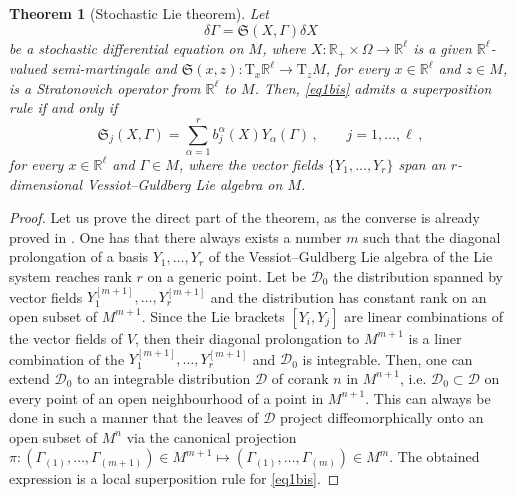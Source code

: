 \documentclass[11pt]{article}
\theoremstyle{plain}
\newtheorem{theorem}{Theorem}[section]
\theoremstyle{definition}
\newcommand{\R}{\mathbb{R}}
\newcommand{\T}{\mathrm{T}}
\begin{document}
\begin{theorem}
  [Stochastic Lie theorem]\label{teorema Lie}Let
  \begin{equation}
    \delta \Gamma = \mathfrak{S}(X, \Gamma) \delta X \label{eq1bis}
  \end{equation}
  be a stochastic differential equation on $M$, where $X :
  \mathbb{R}_+ \times \Omega \rightarrow \mathbb{R}^\ell$ is a given
  $\mathbb{R}^\ell$-valued semi-martingale and $\mathfrak{S}(x, z) : \T_x \mathbb{R}^\ell
  \to \T_z M$, for every $x
\in \mathbb{R}^\ell$ and $z\in M$, is a Stratonovich operator from
  $\R^\ell$ to $M$. Then, \eqref{eq1bis} admits a superposition rule if and only if
\begin{equation}\label{decomposition with the Ys2} \mathfrak{S}_j (X, \Gamma) = \sum_{\alpha = 1}^r b_j^\alpha (X)
      Y_\alpha (\Gamma)\,,\qquad j=1,\ldots,\ell\,,
    \end{equation}
    for every  $x\in \mathbb{R}^\ell$ and $\Gamma\in M$, where the vector fields $\{ Y_1, \ldots, Y_r \}$ span an $r$-dimensional Vessiot--Guldberg Lie algebra  on $M$.
\end{theorem}
\begin{proof} Let us prove the direct part of the theorem, as the converse is already proved in \cite{LO09}. One has that there always exists a number $m$ such that the diagonal prolongation of a basis $Y_1,\ldots,Y_r$ of the Vessiot--Guldberg Lie algebra of the Lie system reaches rank $r$ on a generic point. Let be $\mathcal{D}_0$ the distribution  spanned by vector fields $Y^{[m+1]}_1,\ldots,Y^{[m+1]}_r$ and the distribution has constant rank on an open subset of $M^{m+1}$. Since the Lie brackets $[Y_i,Y_j]$ are linear combinations of the vector fields of $V$, then their diagonal prolongation to $M^{m+1}$ is a liner combination of the $Y^{[m+1]}_1,\ldots,Y^{[m+1]}_r$ and $\mathcal{D}_0$ is integrable. Then, one can extend $\mathcal{D}_0$ to an integrable distribution $\mathcal{D}$ of corank $n$ in $M^{n+1}$, i.e. $\mathcal{D}_0\subset \mathcal{D}$ on every point of an open neighbourhood of a point in $M^{n+1}$. This can always be done in such a manner that the leaves of $\mathcal{D}$ project diffeomorphically onto an open subset of $M^n$ via the canonical projection $\pi:(\Gamma_{(1)},\ldots,\Gamma_{(m+1)})\in M^{m+1}\mapsto(\Gamma_{(1)},\ldots,\Gamma_{(m)})\in M^m$. The obtained expression is a local superposition rule for \eqref{eq1bis}.
\end{proof}
\end{document}
